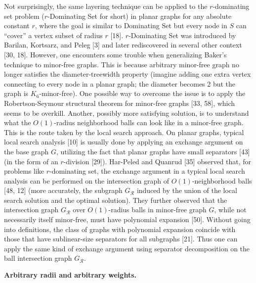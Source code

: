 \documentclass[10pt,a4paper]{article}
\begin{document}
Not surprisingly, the same layering technique can be applied to the $r$-dominating set problem ($r$-Dominating Set for short) in planar graphs for any absolute constant $r$, where the goal is similar to Dominating Set but every node in $S$ can “cover” a vertex subset of radius $r$ [18]. $r$-Dominating Set was introduced by Barilan, Kortsarz, and Peleg [3] and later rediscovered in several other context [30, 18]. However, one encounters some trouble when generalizing Baker’s technique to minor-free graphs. This is because arbitrary minor-free graph no longer satisfies the diameter-treewidth property (imagine adding one extra vertex connecting to every node in a planar graph; the diameter becomes 2 but the graph is $K_{6}$-minor-free). One possible way to overcome the issue is to apply the Robertson-Seymour structural theorem for minor-free graphs [33, 58], which seems to be overkill. Another, possibly more satisfying solution, is to understand what the $O(1)$-radius neighborhood balls can look like in a minor-free graph. This is the route taken by the local search approach. On planar graphs, typical local search analysis [10] is usually done by applying an exchange argument on the base graph $G$, utilizing the fact that planar graphs have small separators [43] (in the form of an $r$-division [29]). Har-Peled and Quanrud [35] observed that, for problems like $r$-dominating set, the exchange argument in a typical local search analysis can be performed on the intersection graph of $O(1)$-neighborhood balls [48, 12] (more accurately, the subgraph $G_{\mathcal{R}}$ induced by the union of the local search solution and the optimal solution). They further observed that the intersection graph $G_{\mathcal{R}}$ over $O(1)$-radius balls in minor-free graph $G$, while not necessarily itself minor-free, must have polynomial expansion [50]. Without going into definitions, the class of graphs with polynomial expansion coincide with those that have sublinear-size separators for all subgraphs [21]. Thus one can apply the same kind of exchange argument using separator decomposition on the ball intersection graph $G_{\mathcal{R}}$.
\par
\par
\par\medskip\noindent\textbf{Arbitrary radii and arbitrary weights.}\par
\end{document}
